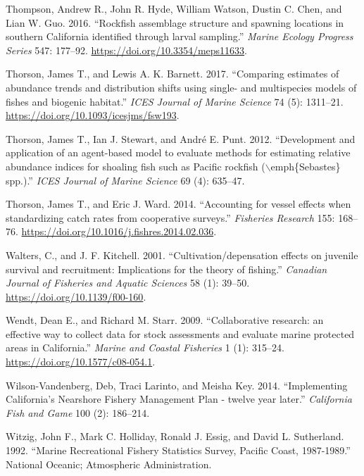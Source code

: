 \documentclass[
  english,
  a4paper,
]{article}
\newlength{\cslhangindent}
\newlength{\cslentryspacingunit} %
\newenvironment{CSLReferences}[2] %
 {%
  \setlength{\parindent}{0pt}
  \ifodd #1
  \let\oldpar\par
  \def\par{\hangindent=\cslhangindent\oldpar}
  \fi
  \setlength{\parskip}{#2\cslentryspacingunit}
 }%
 {}
\begin{document}
\begin{CSLReferences}{1}{0}
\leavevmode{}%
Thompson, Andrew R., John R. Hyde, William Watson, Dustin C. Chen, and Lian W. Guo. 2016. {``{Rockfish assemblage structure and spawning locations in southern California identified through larval sampling}.''} \emph{Marine Ecology Progress Series} 547: 177--92. \url{https://doi.org/10.3354/meps11633}.

\leavevmode{}%
Thorson, James T., and Lewis A. K. Barnett. 2017. {``{Comparing estimates of abundance trends and distribution shifts using single- and multispecies models of fishes and biogenic habitat}.''} \emph{ICES Journal of Marine Science} 74 (5): 1311--21. \url{https://doi.org/10.1093/icesjms/fsw193}.

\leavevmode{}%
Thorson, James T., Ian J. Stewart, and André E. Punt. 2012. {``{Development and application of an agent-based model to evaluate methods for estimating relative abundance indices for shoaling fish such as Pacific rockfish (\(\backslash\)emph{\{}Sebastes{\}} spp.)}.''} \emph{ICES Journal of Marine Science} 69 (4): 635--47.

\leavevmode{}%
Thorson, James T., and Eric J. Ward. 2014. {``{Accounting for vessel effects when standardizing catch rates from cooperative surveys}.''} \emph{Fisheries Research} 155: 168--76. \url{https://doi.org/10.1016/j.fishres.2014.02.036}.

\leavevmode{}%
Walters, C., and J. F. Kitchell. 2001. {``{Cultivation/depensation effects on juvenile survival and recruitment: Implications for the theory of fishing}.''} \emph{Canadian Journal of Fisheries and Aquatic Sciences} 58 (1): 39--50. \url{https://doi.org/10.1139/f00-160}.

\leavevmode{}%
Wendt, Dean E., and Richard M. Starr. 2009. {``{Collaborative research: an effective way to collect data for stock assessments and evaluate marine protected areas in California}.''} \emph{Marine and Coastal Fisheries} 1 (1): 315--24. \url{https://doi.org/10.1577/c08-054.1}.

\leavevmode{}%
Wilson-Vandenberg, Deb, Traci Larinto, and Meisha Key. 2014. {``{Implementing California's Nearshore Fishery Management Plan - twelve year later}.''} \emph{California Fish and Game} 100 (2): 186--214.

\leavevmode{}%
Witzig, John F., Mark C. Holliday, Ronald J. Essig, and David L. Sutherland. 1992. {``{Marine Recreational Fishery Statistics Survey, Pacific Coast, 1987-1989}.''} National Oceanic; Atmospheric Administration.


\end{CSLReferences}
\end{document}
